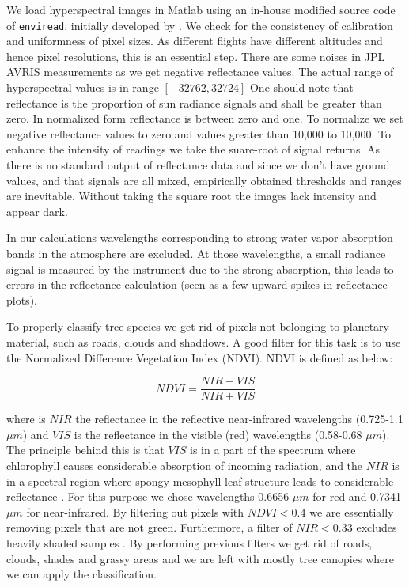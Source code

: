 \documentclass[remotesensing,article,accept,moreauthors,pdftex,12pt,a4paper]{mdpi}
\begin{document}
We load hyperspectral images in Matlab using an in-house modified source code of \texttt{enviread}, initially developed by \cite{howat2007enviread}. We check for the consistency of calibration and uniformness of pixel sizes. As different flights have different altitudes and hence pixel resolutions, this is an essential step. There are some noises in JPL AVRIS measurements as we get negative reflectance values. The actual range of hyperspectral values is in range $[-32762, 32724]$ One should note that reflectance is the proportion of sun radiance signals and shall be greater than zero. In normalized form reflectance is between zero and one. To normalize we set negative reflectance values to zero and values greater than 10,000 to 10,000. To enhance the intensity of readings we take the suare-root of signal returns. As there is no standard output of reflectance data and since we don't have ground values, and that signals are all mixed, empirically obtained thresholds and ranges are inevitable. Without taking the square root the images lack intensity and appear dark.


In our calculations wavelengths corresponding to strong water vapor absorption bands in the atmosphere are excluded. At those wavelengths, a small radiance signal is measured by the instrument due to the strong absorption, this leads to errors in the reflectance calculation (seen as a few upward spikes in reflectance plots). 

To properly classify tree species we get rid of pixels not belonging to planetary material, such as roads, clouds and shaddows. A good filter for this task is to use the Normalized Difference Vegetation Index (NDVI). NDVI is defined as below:

\begin{equation}\label{xx}
NDVI  = \frac{NIR - VIS}{NIR + VIS}
\end{equation}

where is $NIR$ the reflectance in the reflective near-infrared wavelengths (0.725-1.1 $\mu m$) and $VIS$ is the reflectance in the visible (red) wavelengths (0.58-0.68 $\mu m$). The principle behind this is that $VIS$ is in a part of the spectrum where chlorophyll causes considerable absorption of incoming radiation, and the $NIR$ is in a spectral region where spongy mesophyll leaf structure leads to considerable reflectance \cite{tucker1979red, jackson1983discrimination}. For this purpose we chose wavelengths 0.6656 $\mu m$ for red and 0.7341 $\mu m$ for near-infrared. By filtering out pixels with $NDVI < 0.4$ we are essentially removing pixels that are not green. Furthermore, a filter of $NIR < 0.33$  excludes heavily shaded samples \cite{colgan2012mapping}. By performing previous filters we get rid of roads, clouds, shades and grassy areas and we are left with mostly tree canopies where we can apply the classification.
\end{document}
